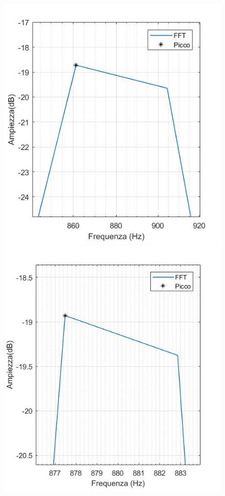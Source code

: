 \documentclass[12pt]{report}
\begin{document}
\begin{figure}[htbp]  \centering 
	\begin{minipage}[c]{.40\textwidth} 
		\centering
		\includegraphics[width= 1.2 \textwidth]{img/1024peak} 
	\end{minipage}%
	\hspace{10mm}%
	\begin{minipage}[c]{.40\textwidth} 
		\centering
		\includegraphics[width= 1.2 \textwidth]{img/8192peak} 

\end{minipage}
\end{figure}
\end{document}
